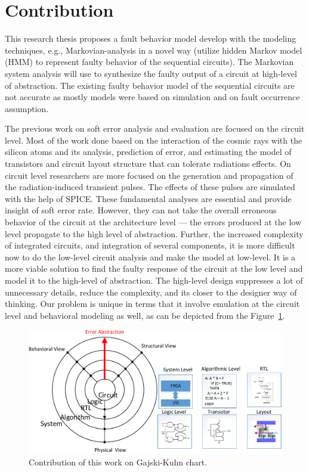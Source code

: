   

\section{Contribution}


This research thesis proposes a fault behavior model develop with the modeling techniques, e.g., Markovian-analysis in a novel way (utilize hidden Markov model (HMM) to represent faulty behavior of the sequential circuits). The Markovian system analysis will use to synthesize the faulty output of a circuit at high-level of abstraction. The existing faulty behavior model of the sequential circuits are not accurate as mostly models were based on simulation and on fault occurrence assumption. 

The previous work on soft error analysis and evaluation are focused on the circuit level. Most of the work done based on the interaction of the cosmic rays with the silicon atoms and its analysis, prediction of error,  and estimating the model of transistors and circuit layout structure that can tolerate radiations effects. On circuit level researchers are more focused on the generation and propagation of the radiation-induced transient pulses. The effects of these pulses are simulated with the help of SPICE. These fundamental analyses are essential and provide insight of soft error rate. However, they can not take the overall erroneous behavior of the circuit at the architecture level --- the errors produced at the low level propagate to the high level of abstraction. Further, the increased complexity of integrated circuits, and integration of several components, it is more difficult now to do the low-level circuit analysis and make the model at low-level. It is a more viable solution to find the faulty response of the circuit at the low level and model it to the high-level of abstraction. The high-level design suppresses a lot of unnecessary details, reduce the complexity, and its closer to the designer way of thinking. Our problem is unique in terms that it involve emulation at the circuit level and behavioral modeling as well, as can be depicted from the Figure~\ref{fig:ychart}.


\begin{figure}[tb!]

 \centering
  \captionsetup{justification=centering}    
   \includegraphics[scale=0.8]{Figures/ychart-block.pdf}
   \caption{Contribution of this work on Gajski-Kuhn chart.}
\label{fig:ychart}
\end{figure}



